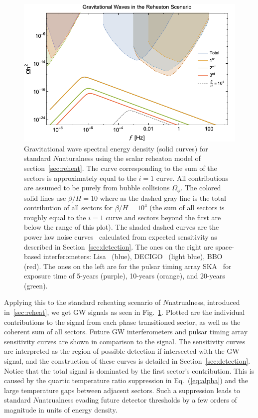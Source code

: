 \documentclass[nofootinbib,twocolumn,preprintnumbers]{revtex4-1}
\begin{document}
\begin{figure}[h!]
\centering
\includegraphics[scale=.3]{Nnatral.png} 
\caption{ Gravitational wave spectral energy density (solid curves) for standard $N$naturalness using the scalar reheaton model of section~\ref{sec:reheat}. The curve corresponding to the sum of the sectors is approximately equal to the $i=1$ curve. All contributions are assumed to be purely from bubble collisions $\Omega_{\phi}$. The colored solid lines use $\beta/H  = 10$ where as the dashed gray line is the total contribution of all sectors for $\beta/H  = 10^4$ (the sum of all sectors is roughly equal to the $i = 1$ curve and sectors beyond the first are below the range of this plot).  The shaded dashed curves are the power law noise curves~\cite{PhysRevD.88.124032} calculated from expected sensitivity as described in Section~\ref{sec:detection}. The ones on the right are space-based interferometers: Lisa~\citep{Audley:2017drz} (blue), DECIGO~\citep{10.1093/ptep/pty078} (light blue), BBO~\citep{PhysRevD.72.083005} (red). The ones on the left are for the pulsar timing array SKA~\cite{Janssen:2014dka} for exposure time of 5-years (purple), 10-years (orange), and 20-years (green). }
\label{fig::Nnatural}
\end{figure}
Applying this to the standard reheating scenario of $N$natrualness, introduced in~\ref{sec:reheat}, we get GW signals as seen in Fig.~\ref{fig::Nnatural}. Plotted are the individual contributions to the signal from each phase transitioned sector, as well as the coherent sum of all sectors. Future GW interferometers and pulsar timing array sensitivity curves are shown in comparison to the signal. The sensitivity curves are interpreted as the region of possible detection if intersected with the GW signal, and the construction of these curves is detailed in Section~\ref{sec:detection}. Notice that the total signal is dominated by the first sector's contribution. This is caused by the quartic temperature ratio suppression in Eq.~(\ref{eq:alpha}) and the large temperature gaps between adjacent sectors. Such a suppression leads to standard $N$natrualness evading future detector thresholds by a few orders of magnitude in units of energy density. 
\end{document}
